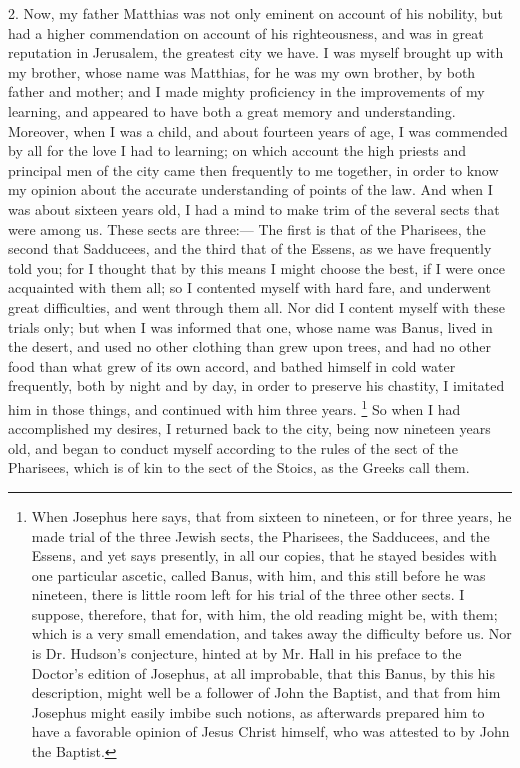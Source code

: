 2. Now, my father Matthias was not only eminent on account of his
nobility, but had a higher commendation on account of his righteousness,
and was in great reputation in Jerusalem, the greatest city we have. I was
myself brought up with my brother, whose name was Matthias, for he was my
own brother, by both father and mother; and I made mighty proficiency in
the improvements of my learning, and appeared to have both a great memory
and understanding. Moreover, when I was a child, and about fourteen years
of age, I was commended by all for the love I had to learning; on which
account the high priests and principal men of the city came then
frequently to me together, in order to know my opinion about the accurate
understanding of points of the law. And when I was about sixteen years
old, I had a mind to make trim of the several sects that were among us.
These sects are three:— The first is that of the Pharisees, the
second that Sadducees, and the third that of the Essens, as we have
frequently told you; for I thought that by this means I might choose the
best, if I were once acquainted with them all; so I contented myself with
hard fare, and underwent great difficulties, and went through them all.
Nor did I content myself with these trials only; but when I was informed
that one, whose name was Banus, lived in the desert, and used no other
clothing than grew upon trees, and had no other food than what grew of its
own accord, and bathed himself in cold water frequently, both by night and
by day, in order to preserve his chastity, I imitated him in those things,
and continued with him three years. \footnote{When Josephus here says,
that from sixteen to nineteen, or for three years, he made trial of the
three Jewish sects, the Pharisees, the Sadducees, and the Essens, and yet
says presently, in all our copies, that he stayed besides with one
particular ascetic, called Banus, with him, and this still before he was
nineteen, there is little room left for his trial of the three other
sects. I suppose, therefore, that for, with him, the old reading might be,
with them; which is a very small emendation, and takes away the difficulty
before us. Nor is Dr. Hudson's conjecture, hinted at by Mr. Hall in his
preface to the Doctor's edition of Josephus, at all improbable, that this
Banus, by this his description, might well be a follower of John the
Baptist, and that from him Josephus might easily imbibe such notions, as
afterwards prepared him to have a favorable opinion of Jesus Christ
himself, who was attested to by John the Baptist.} So when I had
accomplished my desires, I returned back to the city, being now nineteen
years old, and began to conduct myself according to the rules of the sect
of the Pharisees, which is of kin to the sect of the Stoics, as the Greeks
call them.

